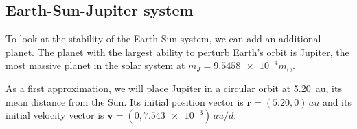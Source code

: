 \documentclass[aps,prc,reprint,nobalancelastpage]{revtex4-1}
\newcommand{\sun}[0]{\ensuremath{\odot}}
\begin{document}
    \subsection{Earth-Sun-Jupiter system}
    \label{sub:jupiter}

        To look at the stability of the Earth-Sun system, we can add an additional planet. The planet with the largest ability to perturb Earth's orbit is Jupiter, the most massive planet in the solar system at $m_J = \num{9.5458e-4}{m_\sun}$.

        As a first approximation, we will place Jupiter in a circular orbit at \SI{5.20}{au}, its mean distance from the Sun. Its initial position vector is $\mathbf{r} = (5.20, 0) \,\si{au}$ and its initial velocity vector is $\mathbf{v} = (0, \num{7.543e-3})\,\si{au/d}$.
\end{document}
